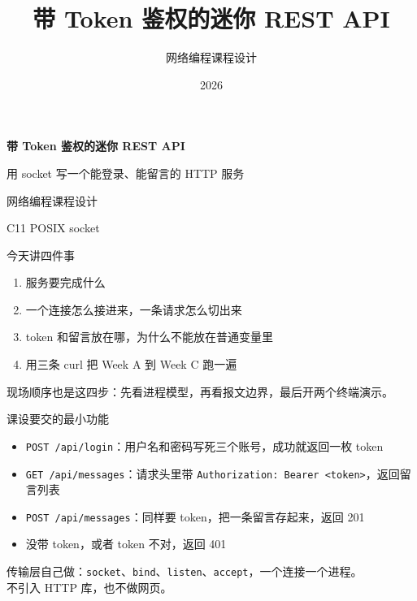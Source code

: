 \documentclass[aspectratio=169,11pt,professionalfonts]{ctexbeamer}
\title{带 Token 鉴权的迷你 REST API}
\author{网络编程课程设计}
\date{2026}
\begin{document}
{
\begin{frame}[plain]
\vspace{1.55cm}
{\color{white}\LARGE\bfseries 带 Token 鉴权的迷你 REST API\par}
\vspace{0.55em}
{\color{white!88}\large 用 socket 写一个能登录、能留言的 HTTP 服务\par}
\vfill
{\color{white!78}网络编程课程设计\par}
\vspace{0.35em}
{\color{white!60}\small C11 \quad POSIX socket \par}
\vspace{0.6cm}
\end{frame}
}

\begin{frame}{今天讲四件事}
\begin{enumerate}
  \item 服务要完成什么
  \item 一个连接怎么接进来，一条请求怎么切出来
  \item token 和留言放在哪，为什么不能放在普通变量里
  \item 用三条 curl 把 Week A 到 Week C 跑一遍
\end{enumerate}
\vspace{0.8em}
现场顺序也是这四步：先看进程模型，再看报文边界，最后开两个终端演示。
\end{frame}

\begin{frame}{课设要交的最小功能}
\begin{itemize}
  \item \texttt{POST /api/login}：用户名和密码写死三个账号，成功就返回一枚 token
  \item \texttt{GET /api/messages}：请求头里带 \texttt{Authorization: Bearer <token>}，返回留言列表
  \item \texttt{POST /api/messages}：同样要 token，把一条留言存起来，返回 201
  \item 没带 token，或者 token 不对，返回 401
\end{itemize}
\vspace{0.7em}
传输层自己做：\texttt{socket}、\texttt{bind}、\texttt{listen}、\texttt{accept}，一个连接一个进程。\\
不引入 HTTP 库，也不做网页。
\end{frame}
\end{document}
